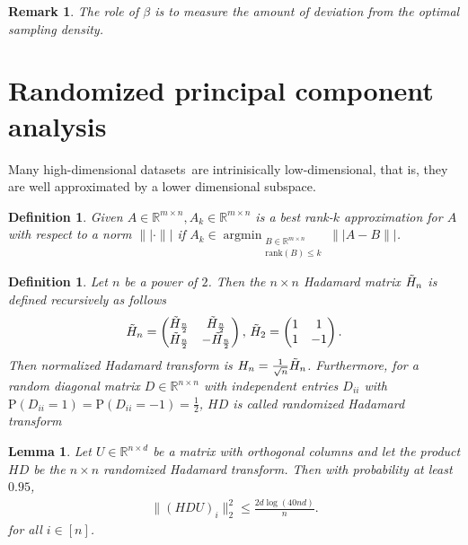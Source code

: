 \documentclass[13pt]{article}
\newtheorem{lem}[thm]{Lemma}
\theoremstyle{plain}
\newtheorem{defi}[thm]{Definition}
\newtheorem*{remark*}{Remark}
\newcommand{\R}{\mathbb{R}}
\renewcommand{\P}{\bm{\mathrm{P}}}
\newcommand{\rank}{\mathrm{rank}}
\DeclareMathOperator{\argmin}{\arg\min}
\newcommand{\til}{\ensuremath{\tilde}}
\begin{document}
\begin{remark*}
    The role of $\beta$ is to measure the amount of deviation from
    the optimal sampling density.
\end{remark*}

\newpage

\section{Randomized principal component analysis}

Many high-dimensional datasets are intrinisically low-dimensional, that is,
they are well approximated by a lower dimensional subspace.

\begin{defi}
    Given $A \in \R^{m \times n}, A_{k} \in \R^{m \times n}$ is a best rank-$k$ approximation for $A$
    with respect to a norm $\| |\cdot\| |$ if $A_k \in \argmin_{\substack{B \in \R^{m \times n}\\ \rank(B) \le k}} \| |A-B\| |$.
\end{defi}

\begin{defi}
    Let $n$ be a power of $2$. Then the $n \times n$ \emph{Hadamard matrix} $\til{H}_n$ is defined recursively as follows
    \[
        \begin{aligned}
            \til{H}_n = \begin{pmatrix} \til{H}_{\frac{n}{2}} & \til{H}_{\frac{n}{2}} \\ \til{H}_{\frac{n}{2}} & -\til{H}_{\frac{n}{2}} \end{pmatrix},
                \, \til{H}_2 = \begin{pmatrix} 1 & 1 \\ 1 & -1 \end{pmatrix}.
        \end{aligned}
    \]
    Then \emph{normalized Hadamard} transform is $H_n = \frac{1}{\sqrt{n}} \til{H}_n$.
    Furthermore, for a random diagonal matrix $D \in \R^{n \times n}$ with independent entries $D_{ii}$
    with $\P(D_{ii} = 1) = \P(D_{ii} = -1) = \frac{1}{2}$, $HD$ is called \emph{randomized Hadamard transform}
\end{defi}

\begin{lem}
    Let $U \in \R^{n \times d}$ be a matrix with orthogonal columns and let the product
    $HD$ be the $n \times n$ randomized Hadamard transform. Then with probability at least $0.95$,
    \[
        \begin{aligned}
            \|(HDU)_i\|_2^2 \le \frac{2d \log(40nd)}{n}.
        \end{aligned}
    \]
    for all $i \in [n]$.
\end{lem}
\end{document}
